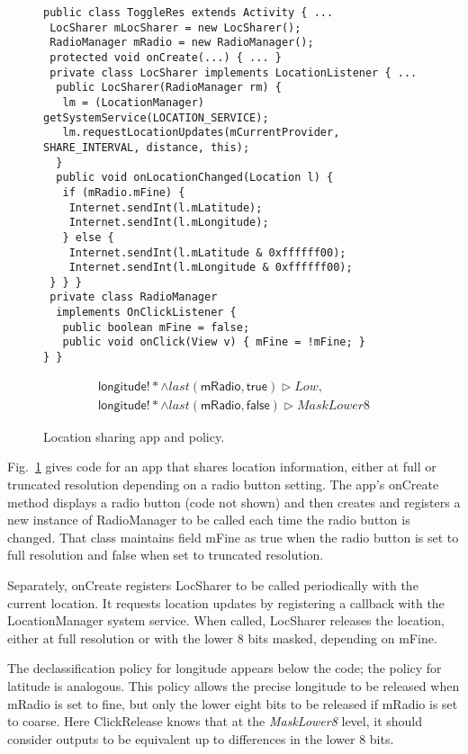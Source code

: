 \documentclass{llncs}
\newcommand{\code}[1]{\textsf{#1}} \newcommand{\bcode}[1]{\texttt{#1}}
\newcommand{\toolname}{ClickRelease\xspace}
\newcommand{\tlast}[2]{\textit{last}(#1, #2)}
\begin{document}
\begin{figure}[t]
\centering
\begin{lstlisting}[name=Ex]
public class ToggleRes extends Activity { ...
 LocSharer mLocSharer = new LocSharer();
 RadioManager mRadio = new RadioManager();
 protected void onCreate(...) { ... }
 private class LocSharer implements LocationListener { ... 
  public LocSharer(RadioManager rm) {
   lm = (LocationManager) getSystemService(LOCATION_SERVICE);
   lm.requestLocationUpdates(mCurrentProvider, SHARE_INTERVAL, distance, this);
  }
  public void onLocationChanged(Location l) {
   if (mRadio.mFine) {
    Internet.sendInt(l.mLatitude);
    Internet.sendInt(l.mLongitude);
   } else {
    Internet.sendInt(l.mLatitude & 0xffffff00);
    Internet.sendInt(l.mLongitude & 0xffffff00);
 } } }
 private class RadioManager
  implements OnClickListener {
   public boolean mFine = false;
   public void onClick(View v) { mFine = !mFine; }
} }
\end{lstlisting}
  \begin{displaymath}
    \begin{array}{ll}
    \code{longitude}!\ast \wedge
    \tlast{\code{mRadio}}{\code{true}} \rhd
    \textit{Low}, \\
    \code{longitude}!\ast \wedge
    \tlast{\code{mRadio}}{\code{false}} \rhd
    \textit{MaskLower8}
    \end{array}
  \end{displaymath}
\caption{Location sharing app and policy.}
\label{fig:app-loc-toggle}
\end{figure}

Fig.~\ref{fig:app-loc-toggle} gives code for an app that
shares location information, either at full or truncated resolution
depending on a radio button setting. The app's \code{onCreate}
method displays a radio button (code not shown) and then creates and
registers a new instance of \code{RadioManager} to be called
each time the radio button is changed. That
class maintains field \code{mFine} as \code{true} when the radio button is
set to full resolution and \code{false} when set to truncated
resolution.

Separately, \code{onCreate} registers \code{LocSharer} to be called
periodically with the current location.  It requests location updates
by registering a callback with the \code{LocationManager}
system service.  When called, \code{LocSharer} releases the
location, either at full resolution or with the lower 8 bits
masked, depending on \code{mFine}.

The declassification policy for longitude appears below the code; the
policy for latitude is analogous.  This policy allows the precise
longitude to be released when
\code{mRadio} is set to fine, but only the lower eight bits to
be released if \code{mRadio} is set to coarse. Here \toolname{}
knows that at the \textit{MaskLower8} level, it should consider
outputs to be equivalent up to differences in the lower 8
bits. 
\end{document}
